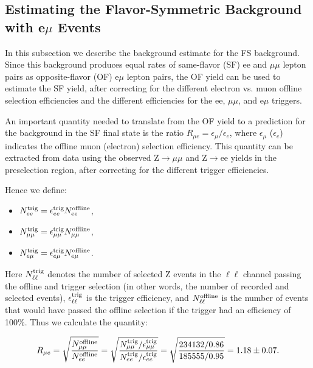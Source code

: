 \subsection{Estimating the Flavor-Symmetric Background with e$\mu$ Events}
\label{sec:bkg_fs}

In this subsection we describe the background estimate for the FS background. Since this background produces equal rates of same-flavor (SF)
ee and $\mu\mu$ lepton pairs as opposite-flavor (OF) e$\mu$ lepton pairs, the OF yield can be used to estimate the SF yield, after
correcting for the different electron vs. muon offline selection efficiencies and the different efficiencies for the ee, $\mu\mu$, and e$\mu$ triggers.

An important quantity needed to translate from the OF yield to a prediction for the background in the SF final state is the ratio 
$R_{\mu e} = \epsilon_\mu / \epsilon_e$, where $\epsilon_\mu$ ($\epsilon_e$) indicates the offline muon (electron) selection efficiency. 
This quantity can be extracted from data using the observed Z$\to\mu\mu$ and Z$\to$ee yields in the preselection region, after correcting 
for the different trigger efficiencies.

Hence we define:

\begin{itemize}
\item $N_{ee}^{\rm{trig}} = \epsilon_{ee}^{\rm{trig}}N_{ee}^{\rm{offline}}$,
\item $N_{\mu\mu}^{\rm{trig}} = \epsilon_{\mu\mu}^{\rm{trig}}N_{\mu\mu}^{\rm{offline}}$,
\item $N_{e\mu}^{\rm{trig}} = \epsilon_{e\mu}^{\rm{trig}}N_{e\mu}^{\rm{offline}}$.
\end{itemize}
 
Here $N_{\ell\ell}^{\rm{trig}}$ denotes the number of selected Z events in the $\ell\ell$ channel passing the offline and trigger selection
(in other words, the number of recorded and selected events), $\epsilon_{\ell\ell}^{\rm{trig}}$ is the trigger efficiency, and 
$N_{\ell\ell}^{\rm{offline}}$ is the number of events that would have passed the offline selection if the trigger had an efficiency of 100\%.
Thus we calculate the quantity:

\begin{equation}
R_{\mu e} = \sqrt{\frac{N_{\mu\mu}^{\rm{offline}}}{N_{ee}^{\rm{offline}}}} = \sqrt{\frac{N_{\mu\mu}^{\rm{trig}}/\epsilon_{\mu\mu}^{\rm{trig}}}{N_{ee}^{\rm{trig}}/\epsilon_{ee}^{\rm{trig}}}} 
= \sqrt{\frac{234132/0.86}{185555/0.95}} = 1.18\pm0.07.
\end{equation}

